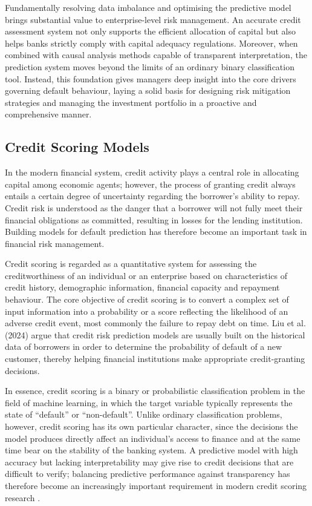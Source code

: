 Fundamentally resolving data imbalance and optimising the predictive model brings substantial value to enterprise-level risk management. An accurate credit assessment system not only supports the efficient allocation of capital but also helps banks strictly comply with capital adequacy regulations. Moreover, when combined with causal analysis methods capable of transparent interpretation, the prediction system moves beyond the limits of an ordinary binary classification tool. Instead, this foundation gives managers deep insight into the core drivers governing default behaviour, laying a solid basis for designing risk mitigation strategies and managing the investment portfolio in a proactive and comprehensive manner.

\subsection{Credit Scoring Models}
\noindent
In the modern financial system, credit activity plays a central role in allocating capital among economic agents; however, the process of granting credit always entails a certain degree of uncertainty regarding the borrower's ability to repay. Credit risk is understood as the danger that a borrower will not fully meet their financial obligations as committed, resulting in losses for the lending institution. Building models for default prediction has therefore become an important task in financial risk management.

Credit scoring is regarded as a quantitative system for assessing the creditworthiness of an individual or an enterprise based on characteristics of credit history, demographic information, financial capacity and repayment behaviour. The core objective of credit scoring is to convert a complex set of input information into a probability or a score reflecting the likelihood of an adverse credit event, most commonly the failure to repay debt on time. Liu et al. (2024) \cite{liu2024credit} argue that credit risk prediction models are usually built on the historical data of borrowers in order to determine the probability of default of a new customer, thereby helping financial institutions make appropriate credit-granting decisions.

In essence, credit scoring is a binary or probabilistic classification problem in the field of machine learning, in which the target variable typically represents the state of ``default'' or ``non-default''. Unlike ordinary classification problems, however, credit scoring has its own particular character, since the decisions the model produces directly affect an individual's access to finance and at the same time bear on the stability of the banking system. A predictive model with high accuracy but lacking interpretability may give rise to credit decisions that are difficult to verify; balancing predictive performance against transparency has therefore become an increasingly important requirement in modern credit scoring research \cite{lessmann2015benchmarking}.

